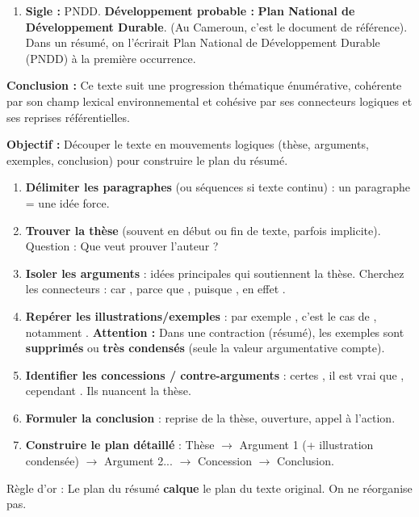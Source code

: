 \documentclass[11pt]{article}
\newcommand{\cle}[1]{{\popxbold\color{popdark}#1}}
\begin{document}
\begin{exoresolu}
\begin{enumerate}
\begin{itemize}
        \item \emph{Connecteur logique :} \og \emph{Par conséquent} \fg{} (conséquence), \og \emph{Cependant} \fg{} (opposition/concession), \og \emph{Ainsi} \fg{} (conséquence/résultat).
        \item \emph{Isotopie (champ lexical) :} Champ lexical de l'environnement / écologie : \og forêts tropicales, bassin du Congo, poumon vert, biodiversité, déforestation, sols, cours d'eau, agroforesterie, préservation forestière \fg{}.
    \end{itemize}
    \item \textbf{Sigle :} \cle{PNDD}. \textbf{Développement probable :} \textbf{Plan National de Développement Durable}. (Au Cameroun, c'est le document de référence). Dans un résumé, on l'écrirait \og Plan National de Développement Durable (PNDD) \fg{} à la première occurrence.
\end{enumerate}
\textbf{Conclusion :} Ce texte suit une progression thématique énumérative, cohérente par son champ lexical environnemental et cohésive par ses connecteurs logiques et ses reprises référentielles.
\end{exoresolu}

\begin{methode}
\textbf{Objectif :} Découper le texte en mouvements logiques (thèse, arguments, exemples, conclusion) pour construire le plan du résumé.
\begin{enumerate}
    \item \textbf{Délimiter les paragraphes} (ou séquences si texte continu) : un paragraphe = une idée force.
    \item \textbf{Trouver la thèse} (souvent en début ou fin de texte, parfois implicite). Question : \og Que veut prouver l'auteur ? \fg{}
    \item \textbf{Isoler les arguments} : idées principales qui soutiennent la thèse. Cherchez les connecteurs : \og car \fg{}, \og parce que \fg{}, \og puisque \fg{}, \og en effet \fg{}.
    \item \textbf{Repérer les illustrations/exemples} : \og par exemple \fg{}, \og c'est le cas de \fg{}, \og notamment \fg{}. \textbf{Attention :} Dans une contraction (résumé), les exemples sont \textbf{supprimés} ou \textbf{très condensés} (seule la valeur argumentative compte).
    \item \textbf{Identifier les concessions / contre-arguments} : \og certes \fg{}, \og il est vrai que \fg{}, \og cependant \fg{}. Ils nuancent la thèse.
    \item \textbf{Formuler la conclusion} : reprise de la thèse, ouverture, appel à l'action.
    \item \textbf{Construire le plan détaillé} : Thèse $\rightarrow$ Argument 1 (+ illustration condensée) $\rightarrow$ Argument 2... $\rightarrow$ Concession $\rightarrow$ Conclusion.
\end{enumerate}
\cle{Règle d'or} : Le plan du résumé \textbf{calque} le plan du texte original. On ne réorganise pas.
\end{methode}
\end{document}
